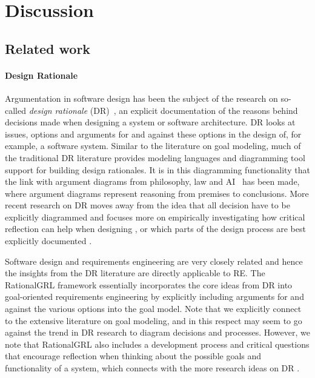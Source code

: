 \section{Discussion}
\label{sect:discussion}

\subsection{Related work}
\label{sect:discussions:relatedwork}

\paragraph{Design Rationale} Argumentation in software design has been the subject of the research on so-called \emph{design rationale} (DR)~\cite{shum2006hypermedia}, an explicit documentation of the reasons behind decisions made when designing a system or software architecture. DR looks at issues, options and arguments for and against these options in the design of, for example, a software system. Similar to the literature on goal modeling, much of the traditional DR literature provides modeling languages and diagramming tool support for building design rationales. It is in this diagramming functionality that the link with argument diagrams from philosophy, law and AI~\cite{reed2004araucaria,gordon2007visualizing} has been made, where argument diagrams represent reasoning from premises to conclusions. More recent research on DR moves away from the idea that all decision have to be explicitly diagrammed and focuses more on empirically investigating how critical reflection can help when designing \cite{razavian2016two,SchriekEtal2016}, or which parts of the design process are best explicitly documented \cite{falessi2013value}. 

Software design and requirements engineering are very closely related \cite{nuseibeh2001weaving} and hence the insights from the DR literature are directly applicable to RE. The RationalGRL framework essentially incorporates the core ideas from DR into goal-oriented requirements engineering by explicitly including arguments for and against the various options into the goal model. Note that we explicitly connect to the extensive literature on goal modeling, and in this respect may seem to go against the trend in DR research to diagram decisions and processes. However, we note that RationalGRL also includes a development process and critical questions that encourage reflection when thinking about the possible goals and functionality of a system, which connects with the more research ideas on DR \cite{razavian2016two,SchriekEtal2016}. 

